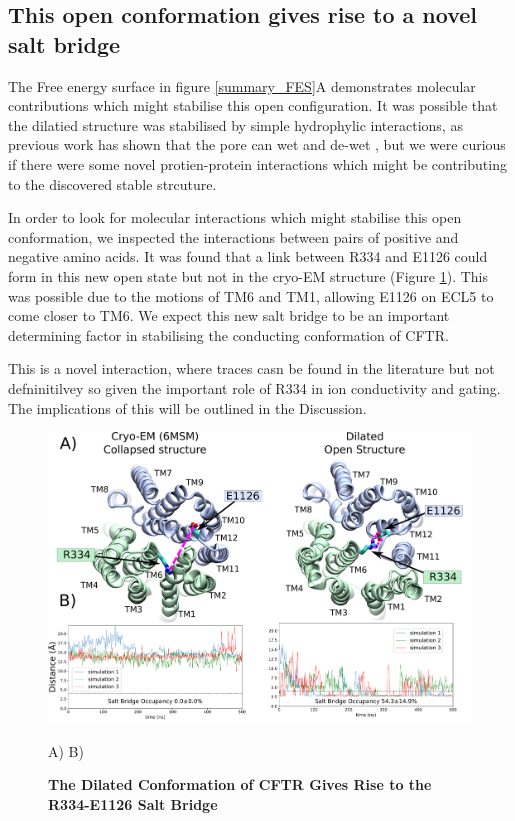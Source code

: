 \subsection{This open conformation gives rise to a novel salt bridge}
\label{salt_bridge}
The Free energy surface in figure \ref{summary_FES}A demonstrates molecular contributions which might stabilise this open configuration. It was possible that the dilatied structure was stabilised by simple hydrophylic interactions, as previous work has shown that the pore can wet and de-wet \cite{}, but we were curious if there were some novel protien-protein interactions which might be contributing to the discovered stable strcuture. 

In order to look for molecular interactions which might stabilise this open conformation, we inspected the interactions between pairs of positive and negative amino acids. It was found that a link between R334 and  E1126 could form in this new open state but not in the cryo-EM structure (Figure \ref{salt_bridge_fig}). This was possible due to the motions of TM6 and TM1, allowing E1126 on ECL5 to come closer to TM6. We expect this new salt bridge to be an important determining factor in stabilising the conducting conformation of CFTR.  

This is a novel interaction, where traces casn be found in the literature but not defninitilvey so given the important role of R334 in ion conductivity and gating. The implications of this will be outlined in the Discussion.

\begin{figure}
	\label{salt_bridge_fig}
	\begin{center}
		\includegraphics[width=1\textwidth]{figures/opening/salt_bridge_E1126_R334_figure.pdf}
	\end{center}
	\captionsetup{singlelinecheck = false, justification=raggedright}
	\caption[The Dilated Conformation of CFTR Gives Rise to the R334-E1126 Salt Bridge] {\textbf{The Dilated Conformation of CFTR Gives Rise to the R334-E1126 Salt Bridge}}{A) B) }
\end{figure}

